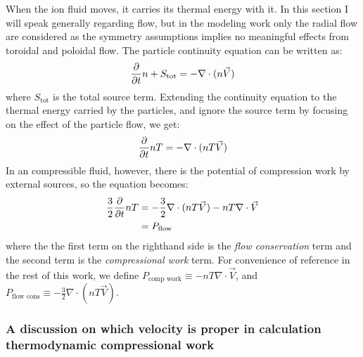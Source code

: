\begin{refsection}
When the ion fluid moves, it carries its thermal energy with it. 
In this section I will speak generally regarding flow, but in the modeling work only the radial flow are considered as the symmetry assumptions implies no meaningful effects from toroidal and poloidal flow. The particle continuity equation can be written as:
\begin{align}
    \frac{\partial}{\partial t} n + S_{\text{tot}} = -\nabla\cdot(n\vec{V}) \label{eqn:continuity}
\end{align}
where $S_{\text{tot}}$ is the total source term. Extending the continuity equation to the thermal energy carried by the particles, and ignore the source term by focusing on the effect of the particle flow, we get:
\begin{align}\label{eqn:thermal_continuity}
    \frac{\partial}{\partial t} nT = -\nabla\cdot(nT\vec{V})
\end{align}
In an compressible fluid, however, there is the potential of compression work by external sources, so the equation becomes:
\begin{align}
    \frac{3}{2}\frac{\partial}{\partial t} nT &= -\frac{3}{2}\nabla\cdot(nT\vec{V}) - nT\nabla\cdot\vec{V}\\
    &= P_{\text{flow}}\nonumber
\end{align}
where the the first term on the righthand side is the \emph{flow conservation} term and the second term is the \emph{compressional work} term. For convenience of reference in the rest of this work, we define $P_{\text{comp work}} \equiv - nT\nabla\cdot\vec{V} $, and $P_{\text{flow cons}} \equiv -\frac{3}{2}\nabla\cdot(nT\vec{V})$.


\subsubsection{A discussion on which velocity is proper in calculation thermodynamic compressional work}


\end{refsection}

